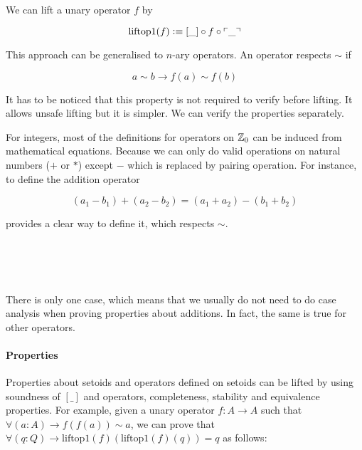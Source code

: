 We can lift a unary operator $f$ by 

$$\text{liftop1}(f) \vcentcolon\equiv [\_] \circ f \circ \ulcorner\_\urcorner$$

This approach can be generalised to $n$-ary operators. An operator respects $\sim$ if


$$a \sim b \to f(a) \sim f(b)$$


It has to be noticed that this property is not required to verify before lifting.
It allows unsafe lifting but it is simpler. We can verify the properties separately. 

For integers, most of the definitions for operators on $\mathbb{Z}_0$ can be induced from mathematical equations. Because we can only do valid operations on natural numbers ($+$ or $*$) except $-$ which is replaced by pairing operation. For instance, to define the addition operator

$$(a_1 - b_1) + (a_2 - b_2) = (a_1 + a_2) - (b_1 + b_2)$$

provides a clear way to define it, which respects $\sim$.

\begin{code}
\\
\>\AgdaFunction{\_+\_} \AgdaSymbol{:}     \<%
\\
\>\AgdaSymbol{(} \AgdaInductiveConstructor{,} \AgdaSymbol{)} \AgdaFunction{+} \AgdaSymbol{(} \AgdaInductiveConstructor{,} \AgdaSymbol{)} \AgdaSymbol{=} \AgdaSymbol{(}  \AgdaSymbol{)} \AgdaInductiveConstructor{,} \AgdaSymbol{(}  \AgdaSymbol{)}\<%
\\
\end{code}

There is only one case, which means that we usually do not need to do case analysis when proving properties about additions. 
In fact, the same is true for other operators.



\paragraph{Properties}

Properties about setoids and operators defined on setoids can be lifted by using soundness of $[\_]$ and operators, completeness, stability and equivalence properties. 
For example, given a unary operator $f : A \to A$ such that $\forall (a : A) \to f (f (a)) \sim a$, we can prove that $\forall(q : Q) \to \text{liftop1}(f)(\text{liftop1}(f)(q)) = q$ as follows:

